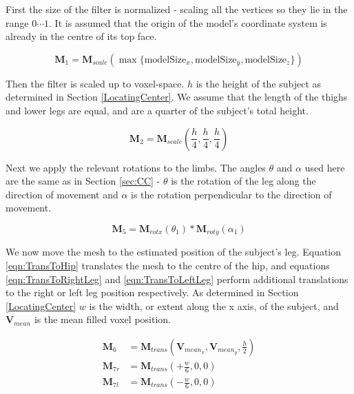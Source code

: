 \bigskip
First the size of the filter is normalized - scaling all the vertices so they lie in the range ${0 \cdots 1}$.
It is assumed that the origin of the model's coordinate system is already in the centre of its top face.

\begin{equation}
	\mathbf{M}_{1} = \mathbf{M}_{scale}(\max \{\text{modelSize}_{x}, \text{modelSize}_{y}, \text{modelSize}_{z} \})
\end{equation}

Then the filter is scaled up to voxel-space.
$h$ is the height of the subject as determined in Section \ref{LocatingCenter}.
We assume that the length of the thighs and lower legs are equal, and are a quarter of the subject's total height.

\begin{equation}
	\mathbf{M}_{2} = \mathbf{M}_{scale}(\frac{h}{4}, \frac{h}{4}, \frac{h}{4})
\end{equation}

Next we apply the relevant rotations to the limbs.
The angles $\theta$ and $\alpha$ used here are the same as in Section \ref{sec:CC} -
$\theta$ is the rotation of the leg along the direction of movement and $\alpha$ is the rotation perpendicular to the direction of movement.

\begin{equation}
	\mathbf{M}_{5} = \mathbf{M}_{rotx}(\theta_{1}) * \mathbf{M}_{roty}(\alpha_{1})
\end{equation}

We now move the mesh to the estimated position of the subject's leg.
Equation \ref{eqn:TransToHip} translates the mesh to the centre of the hip, and equations \ref{eqn:TransToRightLeg} and \ref{eqn:TransToLeftLeg} perform additional
translations to the right or left leg position respectively.
As determined in Section \ref{LocatingCenter} $w$ is the width, or extent along the x axis, of the subject,
and $\mathbf{V}_{mean}$ is the mean filled voxel position.

\begin{align}
	\label{eqn:TransToHip}      \mathbf{M}_{6}  &= \mathbf{M}_{trans}(\mathbf{V}_{mean_{x}}, \mathbf{V}_{mean_{y}}, \frac{h}{2}) \\
	\label{eqn:TransToRightLeg} \mathbf{M}_{7r} &= \mathbf{M}_{trans}(+\frac{w}{6}, 0, 0) \\
	\label{eqn:TransToLeftLeg}  \mathbf{M}_{7l} &= \mathbf{M}_{trans}(-\frac{w}{6}, 0, 0)
\end{align}

